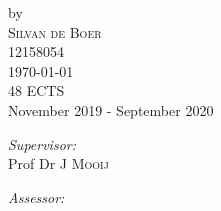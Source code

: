 \begin{titlepage}
    
    
    by\\[0.2cm]
    
    \textsc{\Large Silvan de Boer}\\[0.2cm] %
    
    12158054\\[1cm]
    
    
    
    
    
    
    
    
    
    
    {\Large \today}\\[1cm] %
    
    
    
    48 ECTS\\ %
    
    November 2019 - September 2020\\[1cm]%
    
    
    
    
    
    
    
    \begin{minipage}[t]{0.4\textwidth}

    \begin{flushleft} \large
    
    \emph{Supervisor:} \\
    
    Prof Dr J \textsc{Mooij} %
    
    \end{flushleft}
    
    \end{minipage}%
    \begin{minipage}[t]{0.4\textwidth}
    
    \begin{flushright} \large
    
    \emph{Assessor:} \\
    

\end{flushright}
\end{minipage}
\end{titlepage}
